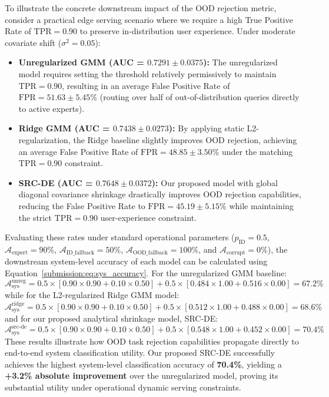 To illustrate the concrete downstream impact of the OOD rejection metric, consider a practical edge serving scenario where we require a high True Positive Rate of $\text{TPR} = 0.90$ to preserve in-distribution user experience. Under moderate covariate shift ($\sigma^2 = 0.05$):
\begin{itemize}
    \item {\bf Unregularized GMM (AUC = $0.7291 \pm 0.0375$):} The unregularized model requires setting the threshold relatively permissively to maintain $\text{TPR}=0.90$, resulting in an average False Positive Rate of $\text{FPR} = 51.63 \pm 5.45\%$ (routing over half of out-of-distribution queries directly to active experts).
    \item {\bf Ridge GMM (AUC = $0.7438 \pm 0.0273$):} By applying static L2-regularization, the Ridge baseline slightly improves OOD rejection, achieving an average False Positive Rate of $\text{FPR} = 48.85 \pm 3.50\%$ under the matching $\text{TPR}=0.90$ constraint.
    \item {\bf SRC-DE (AUC = $0.7648 \pm 0.0372$):} Our proposed model with global diagonal covariance shrinkage drastically improves OOD rejection capabilities, reducing the False Positive Rate to $\text{FPR} = 45.19 \pm 5.15\%$ while maintaining the strict $\text{TPR}=0.90$ user-experience constraint.
\end{itemize}
Evaluating these rates under standard operational parameters ($p_{\text{ID}} = 0.5$, $\mathcal{A}_{\text{expert}} = 90\%$, $\mathcal{A}_{\text{ID\_fallback}} = 50\%$, $\mathcal{A}_{\text{OOD\_fallback}} = 100\%$, and $\mathcal{A}_{\text{corrupt}} = 0\%$), the downstream system-level accuracy of each model can be calculated using Equation~\ref{submission:eq:sys_accuracy}. For the unregularized GMM baseline:
\begin{equation}
\label{submission:eq:sys_accuracy_unreg}
    \mathcal{A}_{\text{sys}}^{\text{unreg}} = 0.5 \times \left[ 0.90 \times 0.90 + 0.10 \times 0.50 \right] + 0.5 \times \left[ 0.484 \times 1.00 + 0.516 \times 0.00 \right] = 67.2\%
\end{equation}
while for the L2-regularized Ridge GMM model:
\begin{equation}
\label{submission:eq:sys_accuracy_ridge}
    \mathcal{A}_{\text{sys}}^{\text{ridge}} = 0.5 \times \left[ 0.90 \times 0.90 + 0.10 \times 0.50 \right] + 0.5 \times \left[ 0.512 \times 1.00 + 0.488 \times 0.00 \right] = 68.6\%
\end{equation}
and for our proposed analytical shrinkage model, SRC-DE:
\begin{equation}
\label{submission:eq:sys_accuracy_srcde}
    \mathcal{A}_{\text{sys}}^{\text{src-de}} = 0.5 \times \left[ 0.90 \times 0.90 + 0.10 \times 0.50 \right] + 0.5 \times \left[ 0.548 \times 1.00 + 0.452 \times 0.00 \right] = 70.4\%
\end{equation}
These results illustrate how OOD task rejection capabilities propagate directly to end-to-end system classification utility. Our proposed SRC-DE successfully achieves the highest system-level classification accuracy of {\bf 70.4\%}, yielding a {\bf +3.2\% absolute improvement} over the unregularized model, proving its substantial utility under operational dynamic serving constraints.

